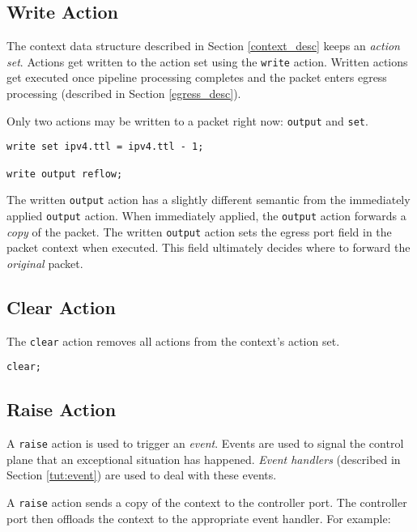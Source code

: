 \subsection{Write Action} \label{tut:write_action}

The context data structure described in Section \ref{context_desc} keeps an
\textit{action set}. Actions get written to the action set using the
\texttt{write} action. Written actions get executed once pipeline processing
completes and the packet enters egress processing (described in Section \ref{egress_desc}).

Only two actions may be written to a packet right now: \texttt{output} and \texttt{set}.

\begin{lstlisting}
write set ipv4.ttl = ipv4.ttl - 1;

write output reflow;
\end{lstlisting}

The written \texttt{output} action has a slightly different semantic from the immediately
applied \texttt{output} action. When immediately applied, the \texttt{output} action forwards a
\textit{copy} of the packet. The written \texttt{output} action sets the egress port field
in the packet context when executed. This field ultimately decides where to forward the
\textit{original} packet.

\subsection{Clear Action} \label{tut:clear_action}

The \texttt{clear} action removes all actions from the context's action set.

\begin{lstlisting}
clear;
\end{lstlisting}

\subsection{Raise Action} \label{tut:raise_action}

A \texttt{raise} action is used to trigger an \textit{event}. Events are used to
signal the control plane that an exceptional situation has happened.
\textit{Event handlers} (described in Section \ref{tut:event}) are used to
deal with these events.

A \texttt{raise} action sends a copy of the context to the controller port.
The controller port then offloads the context to the appropriate event handler.
For example:

